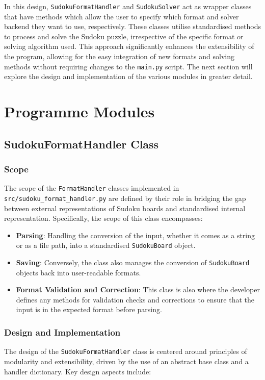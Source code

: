 \documentclass[11pt]{article}
\begin{document}
In this design, \texttt{SudokuFormatHandler} and \texttt{SudokuSolver} act as wrapper classes that have methods which allow the user to specify which format and solver backend they want to use, respectively. These classes utilise standardised methods to process and solve the Sudoku puzzle, irrespective of the specific format or solving algorithm used. This approach significantly enhances the extensibility of the program, allowing for the easy integration of new formats and solving methods without requiring changes to the \texttt{main.py} script. The next section will explore the design and implementation of the various modules in greater detail.

\section{Programme Modules}
\subsection{SudokuFormatHandler Class}

\subsubsection{Scope}
The scope of the \texttt{FormatHandler} classes implemented in \texttt{src/sudoku\_format\_handler.py} are defined by their role in bridging the gap between external representations of Sudoku boards and standardised internal representation. Specifically, the scope of this class encompasses:

\begin{itemize}
\item \textbf{Parsing}: Handling the conversion of the input, whether it comes as a string or as a file path, into a standardised \texttt{SudokuBoard} object.

\item \textbf{Saving}: Conversely, the class also manages the conversion of \texttt{SudokuBoard} objects back into user-readable formats. 

\item \textbf{Format Validation and Correction}: This class is also where the developer defines any methods for validation checks and corrections to ensure that the input is in the expected format before parsing.
\end{itemize}

\subsubsection{Design and Implementation}
The design of the \texttt{SudokuFormatHandler} class is centered around principles of modularity and extensibility, driven by the use of an abstract base class and a handler dictionary. Key design aspects include:
\end{document}
